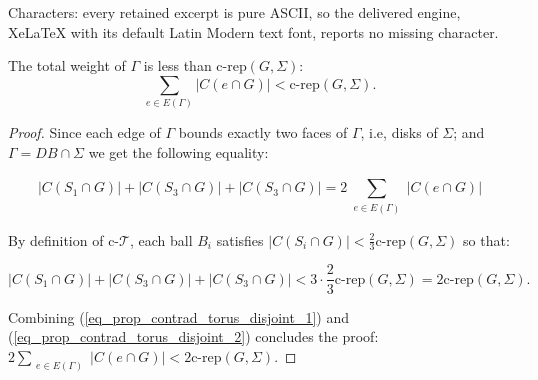 \documentclass[10pt,a4paper]{amsart}
\newcommand\oper[4]{#1 \limits_{\substack{#2}}^{#3}{#4}}
\newcommand{\cT}{\text{c-}\mathcal{T}}
\newcommand{\comprep}{\text{c-rep}}
\begin{document}
Characters: every retained excerpt is pure ASCII, so the delivered engine, XeLaTeX with its default Latin Modern text font, reports no missing character.
\begin{lem}\label{lem_contrad_compress}
The total weight of $\Gamma$ is less than $\comprep(G, \Sigma)$: 
\begin{equation*}
\sum_{e \in E(\Gamma)} |C(e \cap G)| < \comprep(G, \Sigma).
\end{equation*}
\end{lem}

\begin{proof}
Since each edge of $\Gamma$ bounds exactly two faces of $\Gamma$, i.e, disks of $\Sigma$; and $\Gamma = DB \cap \Sigma$ we get the following equality:

\begin{equation}\label{eq_prop_contrad_torus_disjoint_1}
|C(S_1 \cap G)| + |C(S_3 \cap G)| + |C(S_3 \cap G)| = 2\oper{\sum}{e \in E(\Gamma)}{}{|C(e \cap G)|}
\end{equation}

By definition of $\cT$, each ball $B_i$ satisfies $|C(S_i \cap G)| < \frac{2}{3} \comprep (G,\Sigma)$ so that:

\begin{equation}\label{eq_prop_contrad_torus_disjoint_2}
|C(S_1 \cap G)| + |C(S_3 \cap G)| + |C(S_3 \cap G)| < 3 \cdot \frac{2}{3} \comprep (G,\Sigma) = 2 \comprep (G,\Sigma).
\end{equation}

Combining (\ref{eq_prop_contrad_torus_disjoint_1}) and (\ref{eq_prop_contrad_torus_disjoint_2}) concludes the proof: $2\oper{\sum}{e \in E(\Gamma)}{}{|C(e \cap G)|} < 2 \comprep (G,\Sigma)$.
\end{proof}
\end{document}

